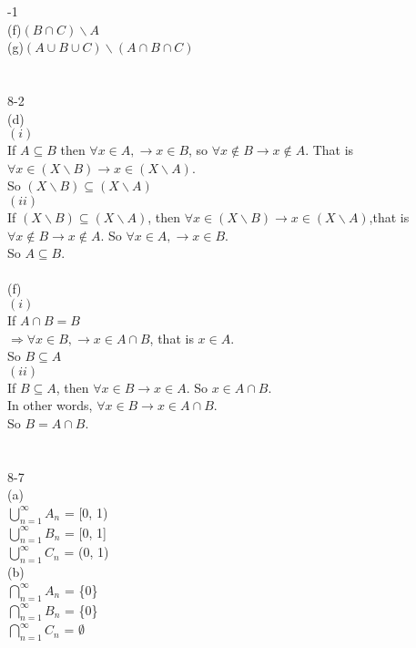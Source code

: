 \documentclass[a4paper, justified]{tufte-handout}
\begin{document}

-1\\
(f)$(B \cap C) \backslash A$\\
(g)$(A \cup B \cup C) \backslash (A \cap B \cap C)$ \\
\\
\\
8-2\\
(d)\\
$(i)$ \\
If $A \subseteq B$ then $\forall x\in A,\rightarrow x \in B$, so $\forall x \notin B \rightarrow x\notin A$. That is $\forall x \in (X \backslash B) \rightarrow x \in (X \backslash A)$.\\
So $(X \backslash B) \subseteq (X \backslash A)$\\
$(ii)$\\
If $(X \backslash B) \subseteq (X \backslash A)$, then $\forall x \in (X \backslash B) \rightarrow x \in (X \backslash A)$,that is $\forall x \notin B \rightarrow x\notin A$. So $\forall x\in A,\rightarrow x \in B$.\\
So $A \subseteq B$.\\
\\
(f)\\
$(i)$\\
If $A \cap B = B$\\
$\Rightarrow \forall x \in B, \rightarrow x \in A \cap B$, that is $x \in A$.\\
So $B \subseteq A$\\
$(ii)$\\
If $B \subseteq A$, then $\forall x \in B \rightarrow x \in A$. So $x \in A \cap B$.\\
In other words, $\forall x \in B \rightarrow x \in A \cap B$.\\
So $B = A\cap B$.\\
\\
\\
8-7\\
(a)\\
$\bigcup^\infty _{n=1}A_n$ = [0, 1)\\
$\bigcup^\infty _{n=1}B_n$ = [0, 1]\\
$\bigcup^\infty _{n=1}C_n$ = (0, 1)\\
(b)\\
$\bigcap^\infty _{n=1}A_n$ = \{0\}\\
$\bigcap^\infty _{n=1}B_n$ = \{0\}\\
$\bigcap^\infty _{n=1}C_n$ = $\emptyset$\\
\end{document}
